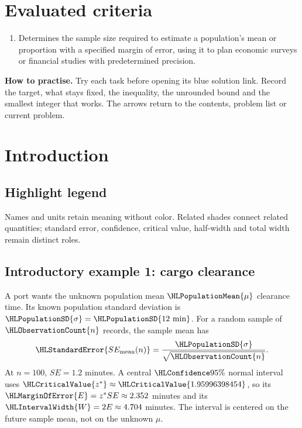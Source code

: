 \maketitle
\setcounter{tocdepth}{1}\setcounter{secnumdepth}{3}
\label{toc}\tableofcontents
\section*{Evaluated criteria}
\begin{enumerate}[label=\textbf{C\arabic*},start=6]
\item Determines the sample size required to estimate a population's mean or proportion with a specified margin of error, using it to plan economic surveys or financial studies with predetermined precision.
\end{enumerate}
\textbf{How to practise.} Try each task before opening its blue solution link. Record the target, what stays fixed, the inequality, the unrounded bound and the smallest integer that works. The arrows return to the contents, problem list or current problem.
\clearpage
\section{Introduction}\label{sec:introduction}
\subsection*{Highlight legend}\label{tab:highlight-legend}
Names and units retain meaning without color. Related shades connect related quantities; standard error, confidence, critical value, half-width and total width remain distinct roles.
\subsection{Introductory example 1: cargo clearance}\label{ex:intro-one}
A port wants the unknown population mean $\HLPopulationMean{\mu}$ clearance time. Its known population standard deviation is $\HLPopulationSD{\sigma}=\HLPopulationSD{12\text{ min}}$. For a random sample of $\HLObservationCount{n}$ records, the sample mean has
\[
\HLStandardError{SE_{\rm mean}(n)}=\frac{\HLPopulationSD{\sigma}}{\sqrt{\HLObservationCount{n}}}.
\]
At $n=100$, $SE=1.2$ minutes. A central $\HLConfidence{95\%}$ normal interval uses $\HLCriticalValue{z^*}\approx\HLCriticalValue{1.95996398454}$, so its $\HLMarginOfError{E}=z^*SE\approx2.352$ minutes and its $\HLIntervalWidth{W}=2E\approx4.704$ minutes. The interval is centered on the future sample mean, not on the unknown $\mu$.
